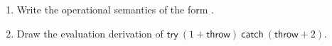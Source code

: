 \begin{enumerate}
\begin{enumerate}
    \item Write the operational semantics of the form
    .
    \item Draw the evaluation derivation of $\textsf{try}\ (1 + \textsf{throw})\ \textsf{catch}\ (\textsf{throw} + 2)$.
\end{enumerate}

\end{enumerate}
